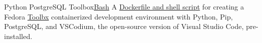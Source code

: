 \datedsubsection{}
{Python PostgreSQL Toolbox}{\href{https://github.com/JacobArchambault?tab=repositories&q=&type=&language=shell&sort=}{Bash}}
{A \href{https://github.com/JacobArchambault/python_postgres_box}{Dockerfile and shell script} for creating a Fedora \href{https://containertoolbx.org/}{Toolbx} containerized development environment with Python, Pip, PostgreSQL, and VSCodium, the open-source version of Visual Studio Code, pre-installed.}
